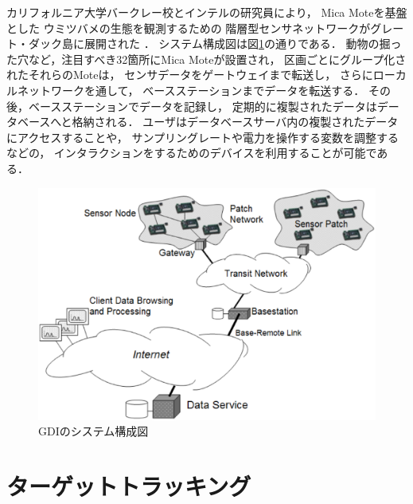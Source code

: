 カリフォルニア大学バークレー校とインテルの研究員により，
Mica Moteを基盤とした
ウミツバメの生態を観測するための
階層型センサネットワークがグレート・ダック島に展開された
\cite{Mainwaring:2002:WSN:570738.570751}．
システム構成図は図\ref{fig:gdi_system_architecture}の通りである．
動物の掘った穴など，注目すべき32箇所にMica Moteが設置され，
区画ごとにグループ化されたそれらのMoteは，
センサデータをゲートウェイまで転送し，
さらにローカルネットワークを通して，
ベースステーションまでデータを転送する．
その後，ベースステーションでデータを記録し，
定期的に複製されたデータはデータベースへと格納される．
ユーザはデータベースサーバ内の複製されたデータにアクセスすることや，
サンプリングレートや電力を操作する変数を調整するなどの，
インタラクションをするためのデバイスを利用することが可能である．

\begin{figure}[htbp]
 \begin{center}
  \includegraphics[width=120mm]{./images/gdi_system_architecture.eps}
 \end{center}
 \caption{GDIのシステム構成図}
 \label{fig:gdi_system_architecture}
\end{figure}




\section{ターゲットトラッキング}

